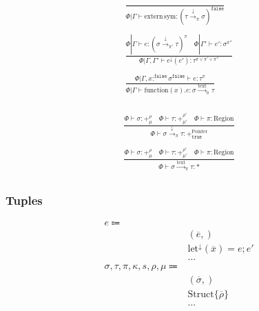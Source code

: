 \documentclass {article}
\begin{document}
\begin{gather*}
\frac
{}
{\Phi | \Gamma \vdash \text{extern} \, \text{sym} : (\tau \xrightarrow{\downarrow}_{\pi} \sigma)^\texttt{false}} \\
\\
\frac
{\Phi | \Gamma \vdash e : (\sigma \xrightarrow{\downarrow}_{\pi'} \tau)^\pi \quad \Phi | \Gamma' \vdash e' : \sigma^{\pi''}}
{\Phi | \Gamma, \Gamma' \vdash e^\downarrow (e') : \tau^{\pi \lor \pi' \lor \pi''}} \\
\\
\frac
{\Phi | \Gamma, x :^\texttt{false} \sigma^\texttt{false} \vdash e : \tau^\pi}
{\Phi | \Gamma \vdash \text{function}(x). e : \sigma \xrightarrow{\text{text}}_\pi \tau} \\
\end{gather*}

\begin{gather*}
\frac
{\Phi \vdash \sigma : +^{\rho}_\mu \quad \Phi \vdash \tau : +^{\rho'}_{\mu'} \quad \Phi \vdash \pi : \text{Region}}
{\Phi \vdash \sigma \xrightarrow{\downarrow}_\pi \tau : +^\text{Pointer}_\texttt{true}} \\
\\
\frac
{\Phi \vdash \sigma : +^{\rho}_\mu \quad \Phi \vdash \tau : +^{\rho'}_{\mu'} \quad \Phi \vdash \pi : \text{Region}}
{\Phi \vdash \sigma \xrightarrow{\text{text}}_\pi \tau : *} \\
\end{gather*}

\subsubsection{Tuples}
\begin{align*}
e \Coloneqq & \\
& (\overline e,) \tag{Tuple Introduction} \\
& \text{let}^\downarrow (\overline x) = e; e' \tag{Tuple Elimination} \\
& \dots \\
\sigma, \tau, \pi, \kappa, s, \rho, \mu \Coloneqq & \\
& (\overline \sigma,) \tag{Tuple} \\
& \text{Struct} \{ \overline \rho \} \tag{Struct Representation} \\
& \dots
\end{align*}
\end{document}
